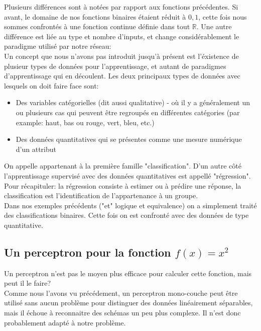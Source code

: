 \documentclass[twoside,openright,a4paper,11pt,french]{article}
\begin{document}
Plusieurs différences sont à notées par rapport aux fonctions précédentes.
Si avant, le domaine de nos fonctions binaires étaient réduit à ${0,1}$, cette
fois nous sommes confrontés à une fonction continue définie dans tout $\mathbb{R}$.
Une autre différence est liée au type et nombre d'inputs, et change
considérablement le paradigme utilisé par notre réseau:\\

Un concept que nous n'avons pas introduit jusqu'à présent est l'éxistence de plusieur
types de données pour l'apprentissage, et autant de paradigmes d'apprentissage qui en
découlent. Les deux principaux types de données avec lesquels on doit faire
face sont:

\begin{itemize}
\item Des variables catégorielles (dit aussi qualitative) - où il y a généralement
      un ou plusieurs cas qui peuvent être regroupés en différentes catégories 
     (par example: haut, bas ou rouge, vert, bleu, etc.)
\item Des données quantitatives qui se présentes comme une mesure numérique d'un attribut
\end{itemize}

On appelle %
appartenant à la première famille "classification". D'un autre côté l'apprentissage
supervisé avec des données quantitatives est appellé "régression".\cite{kindsNN}\\

Pour récapituler: la régression consiste à estimer ou à prédire une réponse,
la classification est l'identification de l'appartenance à un groupe.\\

Dans nos exemples précédents ("et" logique et equivalence) on a simplement
traité des classifications binaires. Cette fois on est confronté avec des données
de type quantitative.


\subsection{Un perceptron pour la fonction $f(x) = x^2$}
Un perceptron n'est pas le moyen plus efficace pour calculer cette 
fonction, mais peut il le faire?\\

Comme nous l'avons vu précédement, un perceptron mono-couche peut être utilisé sans aucun
problème pour distinguer des données linéairement séparables, mais il échoue 
à reconnaitre des schémas un peu plus complexe. Il n'est donc 
probablement adapté à notre problème.\\
\end{document}
